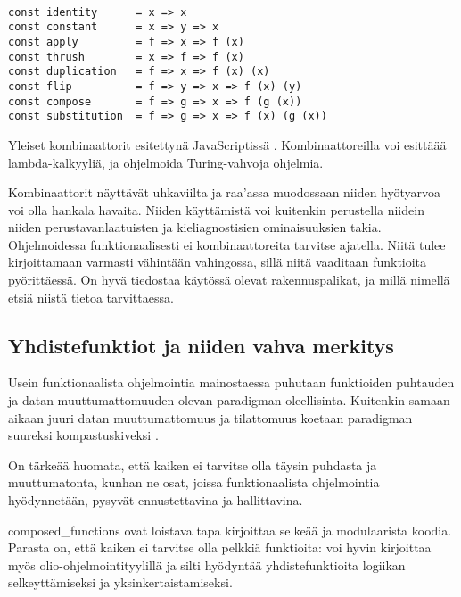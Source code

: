 \begin{code}
	\begin{verbatim}

const identity      = x => x
const constant      = x => y => x
const apply         = f => x => f (x)
const thrush        = x => f => f (x)
const duplication   = f => x => f (x) (x)
const flip          = f => y => x => f (x) (y)
const compose       = f => g => x => f (g (x)) 
const substitution  = f => g => x => f (x) (g (x))

\end{verbatim}
	\caption{Yleiset kombinaattorit esitettynä JavaScriptissä \cite{javascript_combinators}. Kombinaattoreilla voi esittäää lambda-kalkyyliä, ja ohjelmoida Turing-vahvoja ohjelmia.}
	\label{code:javascript_combinators}
\end{code}

Kombinaattorit näyttävät uhkaviilta ja raa'assa muodossaan niiden hyötyarvoa voi olla hankala havaita. Niiden käyttämistä voi kuitenkin perustella niidein niiden perustavanlaatuisten ja kieliagnostisien ominaisuuksien takia. Ohjelmoidessa funktionaalisesti ei kombinaattoreita tarvitse ajatella. Niitä tulee kirjoittamaan varmasti vähintään vahingossa, sillä niitä vaaditaan funktioita pyörittäessä. On hyvä tiedostaa käytössä olevat rakennuspalikat, ja millä nimellä etsiä niistä tietoa tarvittaessa.




\subsection{Yhdistefunktiot ja niiden vahva merkitys}

Usein funktionaalista ohjelmointia mainostaessa puhutaan funktioiden puhtauden ja datan muuttumattomuuden olevan paradigman oleellisinta. Kuitenkin samaan aikaan juuri datan muuttumattomuus ja tilattomuus koetaan paradigman suureksi kompastuskiveksi \cite{cantarella_fp_haitat,is_reduce_bad,vakil2016}.

On tärkeää huomata, että kaiken ei tarvitse olla täysin puhdasta ja muuttumatonta, kunhan ne osat, joissa funktionaalista ohjelmointia hyödynnetään, pysyvät ennustettavina ja hallittavina.

\Glspl{composed_function} ovat loistava tapa kirjoittaa selkeää ja modulaarista koodia. Parasta on, että kaiken ei tarvitse olla pelkkiä funktioita: voi hyvin kirjoittaa myös olio-ohjelmointityylillä ja silti hyödyntää yhdistefunktioita logiikan selkeyttämiseksi ja yksinkertaistamiseksi.

